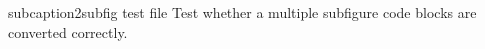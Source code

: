 subcaption2subfig test file
Test whether a multiple subfigure code blocks are converted correctly.

\begin{figure}
\end{figure}

